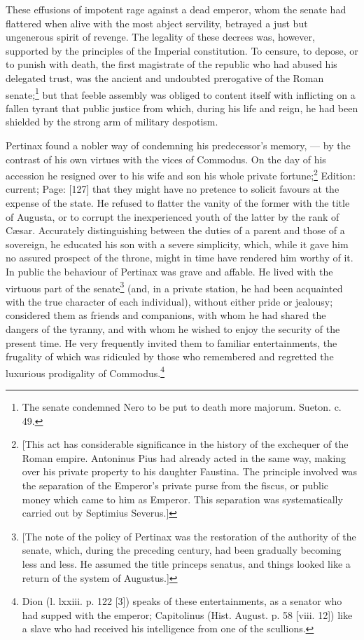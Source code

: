 These effusions of impotent rage against a dead emperor, whom the senate had flattered when alive with the most abject servility, betrayed a just but ungenerous spirit of revenge. The legality of these decrees was, however, supported by the principles of the Imperial constitution. To censure, to depose, or to punish with death, the first magistrate of the republic who had abused his delegated trust, was the ancient and undoubted prerogative of the Roman senate;\footnote{The senate condemned Nero to be put to death more majorum. Sueton. c. 49.} but that feeble assembly was obliged to content itself with inflicting on a fallen tyrant that public justice from which, during his life and reign, he had been shielded by the strong arm of military despotism.

Pertinax found a nobler way of condemning his predecessor\texthebrew{}’s memory, \texthebrew{—} by the contrast of his own virtues with the vices of Commodus. On the day of his accession he resigned over to his wife and son his whole private fortune;\footnote{[This act has considerable significance in the history of the exchequer of the Roman empire. Antoninus Pius had already acted in the same way, making over his private property to his daughter Faustina. The principle involved was the separation of the Emperor\texthebrew{}’s private purse from the fiscus, or public money which came to him as Emperor. This separation was systematically carried out by Septimius Severus.]} Edition: current; Page: [127] that they might have no pretence to solicit favours at the expense of the state. He refused to flatter the vanity of the former with the title of Augusta, or to corrupt the inexperienced youth of the latter by the rank of Cæsar. Accurately distinguishing between the duties of a parent and those of a sovereign, he educated his son with a severe simplicity, which, while it gave him no assured prospect of the throne, might in time have rendered him worthy of it. In public the behaviour of Pertinax was grave and affable. He lived with the virtuous part of the senate\footnote{[The note of the policy of Pertinax was the restoration of the authority of the senate, which, during the preceding century, had been gradually becoming less and less. He assumed the title princeps senatus, and things looked like a return of the system of Augustus.]} (and, in a private station, he had been acquainted with the true character of each individual), without either pride or jealousy; considered them as friends and companions, with whom he had shared the dangers of the tyranny, and with whom he wished to enjoy the security of the present time. He very frequently invited them to familiar entertainments, the frugality of which was ridiculed by those who remembered and regretted the luxurious prodigality of Commodus.\footnote{Dion (l. lxxiii. p. 122 [3]) speaks of these entertainments, as a senator who had supped with the emperor; Capitolinus (Hist. August. p. 58 [viii. 12]) like a slave who had received his intelligence from one of the scullions.}

